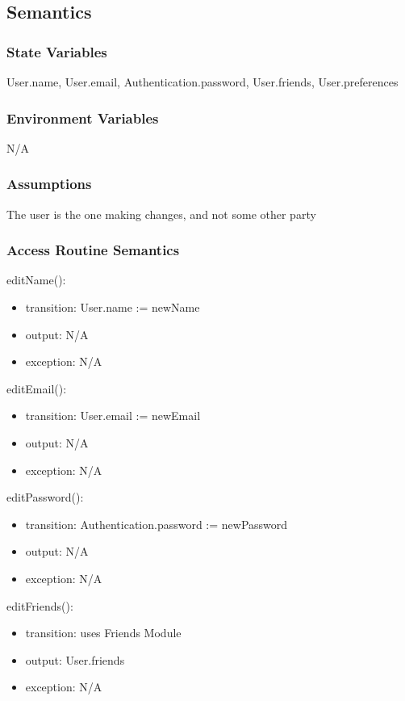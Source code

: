 \documentclass[12pt, titlepage]{article}
\begin{document}
\subsection{Semantics}

\subsubsection{State Variables}
User.name, User.email, Authentication.password, User.friends, User.preferences

\subsubsection{Environment Variables}
N/A

\subsubsection{Assumptions}
The user is the one making changes, and not some other party

\subsubsection{Access Routine Semantics}

\noindent editName():
\begin{itemize}
\item transition: User.name := newName
\item output: N/A
\item exception: N/A
\end{itemize}

\noindent editEmail():
\begin{itemize}
\item transition: User.email := newEmail
\item output: N/A
\item exception: N/A
\end{itemize}

\noindent editPassword():
\begin{itemize}
\item transition: Authentication.password := newPassword
\item output: N/A
\item exception: N/A
\end{itemize}

\noindent editFriends():
\begin{itemize}
\item transition: uses Friends Module
\item output: User.friends
\item exception: N/A
\end{itemize}
\end{document}
